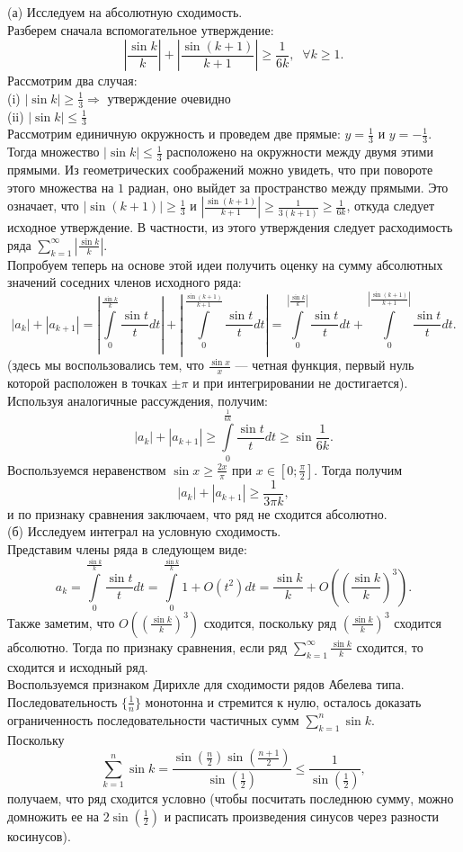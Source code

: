 \documentclass{article}
\begin{document}
(а) Исследуем на абсолютную сходимость.\\
Разберем сначала вспомогательное утверждение:
$$\left| \frac{\sin k}{k} \right| + \left| \frac{\sin (k+1)}{k+1} \right| \geqslant \frac{1}{6k},\;\; \forall k \geqslant 1.$$
Рассмотрим два случая:\\
(i) $|\sin k | \geqslant \frac13 \Rightarrow$ утверждение очевидно\\
(ii) $|\sin k| \leqslant \frac13$\\
Рассмотрим единичную окружность и проведем две прямые: $y=\frac13$ и $y=-\frac13$. Тогда множество $|\sin k| \leqslant \frac13$ расположено на окружности между двумя этими прямыми. 
Из геометрических соображений можно увидеть, что при повороте этого множества на $1$ радиан, оно выйдет за пространство между прямыми. Это означает, что $|\sin(k+1)| \geqslant \frac13$ и 
$\left| \frac{\sin(k+1)}{k+1} \right| \geqslant \frac{1}{3(k+1)} \geqslant \frac{1}{6k}$, откуда следует исходное утверждение. В частности, из этого утверждения следует расходимость ряда $\sum\limits_{k=1}^\infty \left| \frac{\sin k}{k} \right|$.\\
Попробуем теперь на основе этой идеи получить оценку на сумму абсолютных значений соседних членов исходного ряда:
$$|a_k| + |a_{k+1}| = \left| \int\limits_0^{\frac{\sin k}{k}} \frac{\sin t}{t} dt \right| + \left| \int\limits_0^{\frac{\sin (k+1)}{k+1}} \frac{\sin t}{t} dt \right| = \int\limits_0^{\left| \frac{\sin k}{k} \right|} \frac{\sin t}{t} dt + \int\limits_0^{\left| \frac{\sin (k+1)}{k+1} \right|} \frac{\sin t}{t} dt.$$
(здесь мы воспользовались тем, что $\frac{\sin x}{x}$ --- четная функция, первый нуль которой расположен в точках $\pm \pi$ и при интегрировании не достигается).
Используя аналогичные рассуждения, получим:
$$|a_k| + |a_{k+1}| \geqslant \int\limits_0^{\frac{1}{6k}} \frac{\sin t}{t} dt \geqslant \sin \frac{1}{6k}.$$
Воспользуемся неравенством $\sin x \geqslant \frac{2x}{\pi}$ при $x \in [0; \frac{\pi}{2}]$. Тогда получим
$$|a_k| + |a_{k+1}| \geqslant \frac{1}{3\pi k},$$
и по признаку сравнения заключаем, что ряд не сходится абсолютно.\\
(б) Исследуем интеграл на условную сходимость.\\
Представим члены ряда в следующем виде:
$$a_k = \int\limits_0^{\frac{\sin k}{k}} \frac{\sin t}{t} dt = \int\limits_0^{\frac{\sin k}{k}} 1 + O(t^2) dt = \frac{\sin k}{k} + O\left( \left( \frac{\sin k}{k} \right)^3 \right).$$
Также заметим, что $O\left( \left( \frac{\sin k}{k} \right)^3 \right)$ сходится, поскольку ряд $\left( \frac{\sin k}{k} \right)^3$ сходится абсолютно. Тогда по признаку сравнения, если ряд $\sum\limits_{k=1}^\infty \frac{\sin k}{k}$ сходится, то сходится и исходный ряд.\\
Воспользуемся признаком Дирихле для сходимости рядов Абелева типа. Последовательность $\{\frac{1}{n}\}$ монотонна и стремится к нулю, осталось доказать ограниченность последовательности 
частичных сумм $\sum\limits_{k=1}^n \sin k$.\\
Поскольку
$$\sum\limits_{k=1}^n \sin k = \frac{\sin(\frac{n}{2}) \sin(\frac{n+1}{2})}{\sin(\frac{1}{2})} \leqslant \frac{1}{\sin (\frac12)},$$
получаем, что ряд сходится условно (чтобы посчитать последнюю сумму, можно домножить ее на $2\sin(\frac12)$ и расписать произведения синусов через разности косинусов).
\end{document}
